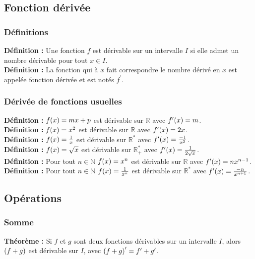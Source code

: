 \documentclass[a4paper,titlepage]{article}
\let\oldleft\left
\renewcommand{\left}{\mathopen{}\mathclose\bgroup\oldleft}
\let\oldright\right
\renewcommand{\right}{\aftergroup\egroup\oldright}
\begin{document}
    \subsection{Fonction dérivée}
        \subsubsection{Définitions}
            \textbf{Définition :} Une fonction $f$ est dérivable sur un intervalle $I$ si elle admet un nombre dérivable pour tout $x\in I$.
            \\
            \textbf{Définition :} La fonction qui à $x$ fait correspondre le nombre dérivé en $x$ est appelée fonction dérivée et est notés $f^{\prime}$.
        \subsubsection{Dérivée de fonctions usuelles}
            \textbf{Définition :} $f\left(x\right)=mx+p$ est dérivable sur $\mathbb{R}$ avec $f^{\prime}\left(x\right)=m$.
            \\
            \textbf{Définition :} $f\left(x\right)=x^{2}$ est dérivable sur $\mathbb{R}$ avec $f^{\prime}\left(x\right)=2x$.
            \\
            \textbf{Définition :} $f\left(x\right)=\frac{1}{x}$ est dérivable sur $\mathbb{R}^{*}$ avec $f^{\prime}\left(x\right)=\frac{-1}{x^{2}}$.
            \\
            \textbf{Définition :} $f\left(x\right)=\sqrt{x}$ est dérivable sur $\mathbb{R}_{+}^{*}$ avec $f^{\prime}\left(x\right)=\frac{1}{2\sqrt{x}}$.
            \\
            \textbf{Définition :} Pour tout $n\in\mathbb{N}$ $f\left(x\right)=x^{n}$ est dérivable sur $\mathbb{R}$ avec $f^{\prime}\left(x\right)=nx^{n-1}$.
            \\
            \textbf{Définition :} Pour tout $n\in\mathbb{N}$ $f\left(x\right)=\frac{1}{x^{n}}$ est dérivable sur $\mathbb{R}^{*}$ avec $f^{\prime}\left(x\right)=\frac{-n}{x^{n+1}}$.
    \subsection{Opérations}
        \subsubsection{Somme}
            \textbf{Théorème :} Si $f$ et $g$ sont deux fonctions dérivables sur un intervalle $I$, alors $\left(f+g\right)$ est dérivable sur $I$, avec $\left(f+g\right)^{\prime}=f^{\prime}+g^{\prime}$.
\end{document}
